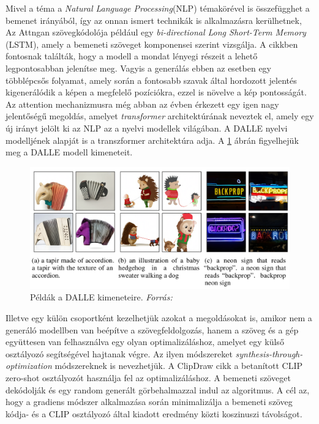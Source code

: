 Mivel a téma a \textit{Natural Language Processing}(NLP) témakörével is összefügghet a bemenet irányából, így az onnan ismert technikák is alkalmazásra kerülhetnek,
Az Attngan \cite{xu2018attngan} szövegkódolója például egy \textit{bi-directional Long Short-Term Memory} (LSTM), amely a bemeneti szöveget komponensei szerint vizsgálja. A cikkben fontosnak találták, hogy a modell a mondat lényegi részeit a lehető legpontosabban jelenítse meg. Vagyis a generálás ebben az esetben egy többlépcsős folyamat, amely során a fontosabb szavak által hordozott jelentés kigenerálódik a képen a megfelelő pozíciókra, ezzel is növelve a kép pontosságát. Az attention mechanizmusra még abban az évben érkezett egy igen nagy jelentőségű megoldás, amelyet \textit{transformer} architektúrának \cite{vaswani2017attention} neveztek el, amely egy új irányt jelölt ki az NLP az a nyelvi modellek világában. A DALLE \cite{ramesh2021zero} nyelvi modelljének alapját is a transzformer architektúra adja. A \ref{fig:dalle} ábrán figyelhejük meg a DALLE modell kimeneteit.

\begin{figure}[h]
	\centering
	\includegraphics[width=13cm]{images/dalle.png}
	\caption{Példák a DALLE kimeneteire. \textit{Forrás: \cite{ramesh2021zero}} }
	\label{fig:dalle}
\end{figure}

Illetve egy külön csoportként kezelhetjük azokat a megoldásokat is, amikor nem a generáló modellben van beépítve a szövegfeldolgozás, hanem a szöveg és a gép együttesen van felhasználva egy olyan optimalizáláshoz, amelyet egy külső osztályozó segítségével hajtanak végre. Az ilyen módszereket \textit{synthesis-through-optimization} módszereknek \cite{frans2021clipdraw} is nevezhetjük. A ClipDraw cikk a betanított CLIP zero-shot osztályozót használja fel az optimalizáláshoz. A bemeneti szöveget dekódolják és egy random generált görbehalmazzal indul az algoritmus. A cél az, hogy a gradiens módszer alkalmazása során minimalizálja a bemeneti szöveg kódja- és a CLIP osztályozó által kiadott eredmény közti koszinuszi távolságot.

